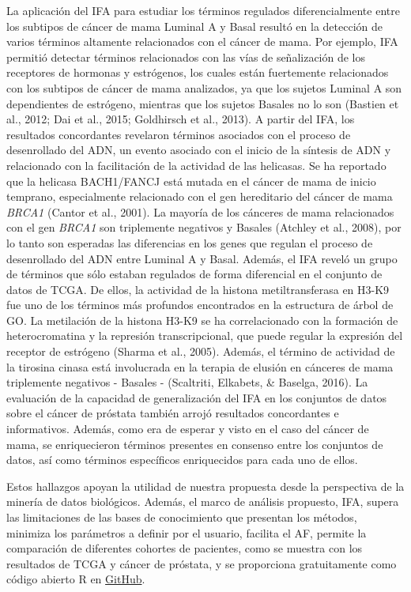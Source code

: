 \documentclass[12pt,twoside]{reedthesis}
\begin{document}
La aplicación del IFA para estudiar los términos regulados diferencialmente entre los subtipos de cáncer de mama Luminal A y Basal resultó en la detección de varios términos altamente relacionados con el cáncer de mama. Por ejemplo, IFA permitió detectar términos relacionados con las vías de señalización de los receptores de hormonas y estrógenos, los cuales están fuertemente relacionados con los subtipos de cáncer de mama analizados, ya que los sujetos Luminal A son dependientes de estrógeno, mientras que los sujetos Basales no lo son (Bastien et al., 2012; Dai et al., 2015; Goldhirsch et al., 2013). A partir del IFA, los resultados concordantes revelaron términos asociados con el proceso de desenrollado del ADN, un evento asociado con el inicio de la síntesis de ADN y relacionado con la facilitación de la actividad de las helicasas. Se ha reportado que la helicasa BACH1/FANCJ está mutada en el cáncer de mama de inicio temprano, especialmente relacionado con el gen hereditario del cáncer de mama \emph{BRCA1} (Cantor et al., 2001). La mayoría de los cánceres de mama relacionados con el gen \emph{BRCA1} son triplemente negativos y Basales (Atchley et al., 2008), por lo tanto son esperadas las diferencias en los genes que regulan el proceso de desenrollado del ADN entre Luminal A y Basal. Además, el IFA reveló un grupo de términos que sólo estaban regulados de forma diferencial en el conjunto de datos de TCGA. De ellos, la actividad de la histona metiltransferasa en H3-K9 fue uno de los términos más profundos encontrados en la estructura de árbol de GO. La metilación de la histona H3-K9 se ha correlacionado con la formación de heterocromatina y la represión transcripcional, que puede regular la expresión del receptor de estrógeno (Sharma et al., 2005). Además, el término de actividad de la tirosina cinasa está involucrada en la terapia de elusión en cánceres de mama triplemente negativos - Basales - (Scaltriti, Elkabets, \& Baselga, 2016). La evaluación de la capacidad de generalización del IFA en los conjuntos de datos sobre el cáncer de próstata también arrojó resultados concordantes e informativos. Además, como era de esperar y visto en el caso del cáncer de mama, se enriquecieron términos presentes en consenso entre los conjuntos de datos, así como términos específicos enriquecidos para cada uno de ellos.

\par

Estos hallazgos apoyan la utilidad de nuestra propuesta desde la perspectiva de la minería de datos biológicos. Además, el marco de análisis propuesto, IFA, supera las limitaciones de las bases de conocimiento que presentan los métodos, minimiza los parámetros a definir por el usuario, facilita el AF, permite la comparación de diferentes cohortes de pacientes, como se muestra con los resultados de TCGA y cáncer de próstata, y se proporciona gratuitamente como código abierto R en \href{http://github.com/jcrodriguez1989/IFA}{GitHub}.
\end{document}
